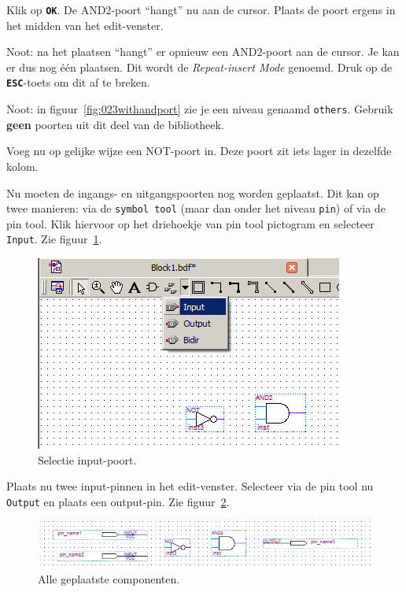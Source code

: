 \documentclass[a4paper,12pt,fleqn,twoside]{book}
\def\tutpicscale{0.455}
\newcommand{\knop}[1]{\texttt{\textbf{#1}}}
\newcommand{\naam}[1]{\texttt{#1}}
\begin{document}
Klik op \knop{OK}. De AND2-poort ``hangt'' nu aan de cursor. Plaats de poort
ergens in het midden van het edit-venster. 

Noot: na het plaatsen ``hangt'' er opnieuw een AND2-poort aan de cursor. Je
kan er dus nog \'{e}\'{e}n plaatsen. Dit wordt de \textsl{Repeat-insert Mode}
genoemd. Druk op de \knop{ESC}-toets om dit af te breken.

Noot: in figuur~\ref{fig:023withandport} zie je een niveau genaamd
\naam{others}. Gebruik \textbf{geen} poorten uit dit deel van de bibliotheek.
 
Voeg nu op gelijke wijze een NOT-poort in. Deze poort zit iets lager in
dezelfde kolom. 
 
Nu moeten de ingangs- en uitgangspoorten nog worden geplaatst. Dit kan op twee
manieren: via de \naam{symbol tool} (maar dan onder het niveau \naam{pin})
of via de pin tool. Klik hiervoor op het driehoekje van pin tool
pictogram en selecteer \naam{Input}. Zie figuur~\ref{fig:025selectinput}.

\begin{figure}[H]
\centering
\includegraphics[scale=\tutpicscale]{025selectinput}
\caption{Selectie input-poort.}
\label{fig:025selectinput}
\end{figure}

Plaats nu twee input-pinnen in het edit-venster. Selecteer via de pin tool nu
\naam{Output} en plaats een output-pin.
Zie figuur~\ref{fig:026schematicnowires}.

\begin{figure}[H]
\centering
\includegraphics[scale=\tutpicscale]{026schematicnowires}
\caption{Alle geplaatste componenten.}
\label{fig:026schematicnowires}
\end{figure}
\end{document}
